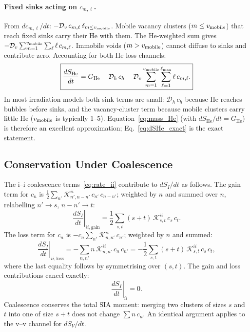 \documentclass[pdflatex,sn-basic]{sn-jnl} %
\begin{document}
\paragraph{Fixed sinks acting on $c_{m,\ell}$.}
From $dc_{m,\ell}/dt$: $-\mathcal{D}_v\,c_{m,\ell}\,\delta_{m \leq v_{\rm mobile}}$.
Mobile vacancy clusters ($m \leq v_{\rm mobile}$) that reach fixed sinks carry their
He with them. The He-weighted sum gives
$-\mathcal{D}_v\sum_{m=1}^{v_{\rm mobile}}\sum_\ell \ell\,c_{m,\ell}$.
Immobile voids ($m > v_{\rm mobile}$) cannot diffuse to sinks and contribute zero.
Accounting for both He loss channels:
\begin{equation}\label{eq:dSHe_exact}
\boxed{
    \frac{dS_{\mathrm{He}}}{dt}
    = G_{\mathrm{He}} - \mathcal{D}_h\,c_h
    - \mathcal{D}_v\sum_{m=1}^{v_{\rm mobile}}
      \sum_{\ell=1}^{\ell_{\max}}\ell\,c_{m,\ell}.
}
\end{equation}
In most irradiation models both sink terms are small:
$\mathcal{D}_h\,c_h$ because He reaches bubbles before sinks, and
the vacancy-cluster term because mobile clusters carry little He
($v_{\rm mobile}$ is typically 1--5). Equation~\eqref{eq:mass_He}
(with $dS_{\mathrm{He}}/dt = G_{\mathrm{He}}$) is therefore an excellent
approximation; Eq.~\eqref{eq:dSHe_exact} is the exact statement.

\subsection{Conservation Under Coalescence}
\label{app:coal}

The i--i coalescence terms~\eqref{eq:rate_ii} contribute to $dS_I/dt$ as
follows. The gain term for $c_n$ is
$\tfrac{1}{2}\sum_{n'}\mathcal{K}_{n',n-n'}^{ii}\,c_{n'}\,c_{n-n'}$;
weighted by $n$ and summed over $n$, relabelling $n' \to s$, $n-n' \to t$:
\begin{equation}
    \left.\frac{dS_I}{dt}\right|_{ii,\mathrm{gain}}
    = \frac{1}{2}\sum_{s,t}(s+t)\,\mathcal{K}_{s,t}^{ii}\,c_s\,c_t.
\end{equation}
The loss term for $c_n$ is $-c_n\sum_{n'}\mathcal{K}_{n,n'}^{ii}\,c_{n'}$;
weighted by $n$ and summed:
\begin{equation}
    \left.\frac{dS_I}{dt}\right|_{ii,\mathrm{loss}}
    = -\sum_{n,n'} n\,\mathcal{K}_{n,n'}^{ii}\,c_n\,c_{n'}
    = -\frac{1}{2}\sum_{s,t}(s+t)\,\mathcal{K}_{s,t}^{ii}\,c_s\,c_t,
\end{equation}
where the last equality follows by symmetrising over $(s,t)$. The gain and
loss contributions cancel exactly:
\begin{equation}
    \left.\frac{dS_I}{dt}\right|_{ii} = 0.
\end{equation}
Coalescence conserves the total SIA moment: merging two clusters of sizes
$s$ and $t$ into one of size $s+t$ does not change $\sum n\,c_n$. An
identical argument applies to the v--v channel for $dS_V/dt$.
\end{document}
